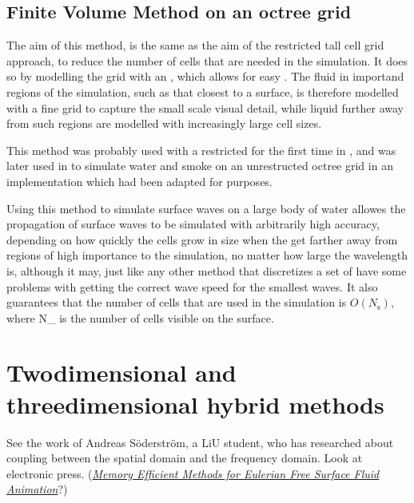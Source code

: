 \subsection{Finite Volume Method on an octree grid}

The aim of this method, is the same as the aim of the restricted tall cell grid approach, to reduce the number of cells that are needed in the simulation. It does so by modelling the grid with an \octree, which allows for easy . The fluid in importand regions of the simulation, such as that closest to a surface, is therefore modelled with a fine grid to capture the small scale visual detail, while liquid further away from such regions are modelled with increasingly large cell sizes.

This method was probably used with a restricted  for the first time in \citep{Popinet2003}, and was later used in \citealp{Losasso2004} to simulate water and smoke on an unrestructed octree grid in an implementation which had been adapted for  purposes. 

Using this method to simulate surface waves on a large body of water allowes the propagation of surface waves to be simulated with arbitrarily high accuracy, depending on how quickly the cells grow in size when the get farther away from regions of high importance to the simulation, no matter how large the wavelength is, although it may, just like any other method that discretizes a set of \PDEs have some problems with getting the correct wave speed for the smallest waves. It also guarantees that the number of cells that are used in the simulation is $O(N_{\text{s}})$, where N_{} is the number of cells visible on the surface.

\section{Twodimensional and threedimensional hybrid methods}

See the work of Andreas Söderström, a LiU student, who has researched about coupling between the spatial domain and the frequency domain. Look at electronic press. (\textit{\href{http://liu.diva-portal.org/smash/get/diva2:359805/FULLTEXT01}{Memory Efficient Methods for Eulerian Free Surface Fluid Animation}}?)